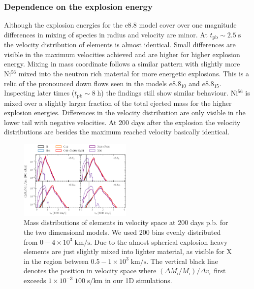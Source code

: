 \documentclass[fleqn,usenatbib]{mnras}
\newcommand{\nickel}{$\mathrm{Ni^{56}}$\xspace}
\newcommand{\tracer}{$\mathrm{X}$\xspace}
\begin{document}
\subsubsection{Dependence on the explosion energy}
\label{subsec:Dependence on the explosion energy}
Although the explosion energies for the e8.8 model cover over one magnitude differences in mixing of species in radius and velocity are minor. At $t_{\mathrm{pb}}\sim 2.5 \;\mathrm{s}$ the velocity distribution of elements is almost identical. Small differences are visible in the maximum velocities achieved and are higher for higher explosion energy. Mixing in mass coordinate follows a similar pattern with slightly more \nickel mixed into the neutron rich material for more energetic explosions. This is a relic of the pronounced down flows seen in the models $e8.8_{10}$ and $e8.8_{15}$. 
Inspecting later times ($t_{\mathrm{pb}}\sim 8 \;\mathrm{h}$) the findings still show similar behaviour. \nickel is mixed over a slightly larger fraction of the total ejected mass for the higher explosion energies. Differences in the velocity distribution are only visible in the lower tail with negative velocities. 
At 200 days after the explosion the velocity distributions are besides the maximum reached velocity basically identical.
\begin{figure}
 \label{fig:e8_massDis_32d}
 \centering
 \includegraphics[width=0.49\textwidth]{pic/massDis_mvr_all_time_200d.pdf}
 \caption{Mass distributions of elements in velocity space at 200 days p.b. for the two dimensional models. We used 200 bins evenly distributed from  $0-4\times 10^3\;\mathrm{km/s}$. Due to the almost spherical explosion heavy elements are just slightly mixed into lighter material, as visible for \tracer in the region between $0.5-1\times 10^3\;\mathrm{km/s}$. The vertical black line denotes the position in velocity space where $(\Delta M_{\mathrm{i}}/M_{\mathrm{i}})/\Delta v_{\mathrm{r}}$ first exceeds $1\times 10^{-3}\;\mathrm{100\;s/km}$ in our 1D simulations.}
\end{figure}
\end{document}
